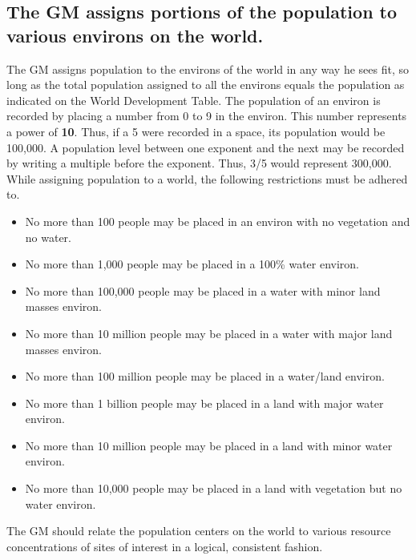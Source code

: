 \subsection[Population Distribution]{The GM assigns portions of the
        population to various environs on the world.}
\label{sec:population-dist}


The GM assigns population to the environs of the world in any way he
sees fit, so long as the total population assigned to all the environs
equals the population as indicated on the World Development Table. The
population of an environ is recorded by placing a number from 0 to 9
in the environ. This number represents a power of \textbf{10}. Thus,
if a 5 were recorded in a space, its population would be 100,000. A
population level between one exponent and the next may be recorded by
writing a multiple before the exponent. Thus, 3/5 would represent
300,000. While assigning population to a world, the following
restrictions must be adhered to.

\begin{itemize}
\item No more than 100 people may be placed in an environ with no
  vegetation and no water.
\item No more than 1,000 people may be placed in a 100\% water
  environ.
\item No more than 100,000 people may be placed in a water with minor
  land masses environ.
\item No more than 10 million people may be placed in a water with
  major land masses environ.
\item No more than 100 million people may be placed in a water/land
  environ.
\item No more than 1 billion people may be placed in a land with major
  water environ.
\item No more than 10 million people may be placed in a land with
  minor water environ.
\item No more than 10,000 people may be placed in a land with
  vegetation but no water environ.
\end{itemize}

The GM should relate the population centers on the world to various
resource concentrations of sites of interest in a logical, consistent
fashion.

